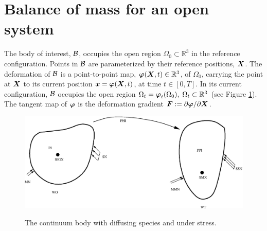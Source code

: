 \section{Balance of mass for an open system}
\label{sect2} The body of interest, ${\mathcal B}$, occupies the open
region $\Omega_0\subset\mathbb{R}^3$ in the reference
configuration. Points in ${\mathcal B}$ are parameterized by their
reference positions, $\mbox{\boldmath$ X$}$. The deformation of ${\mathcal B}$ is a
point-to-point map, $\mbox{\boldmath$\varphi$} (\mbox{\boldmath$ X$},t)\in\mathbb{R}^3$, of
$\Omega_0$, carrying the point at $\mbox{\boldmath$ X$}$ to its current position
$\mbox{\boldmath$ x$} = \mbox{\boldmath$\varphi$}(\mbox{\boldmath$ X$},t)$, at time $t\in [0,T]$. In its current
configuration, ${\mathcal B}$ occupies the open region $\Omega_t =
\mbox{\boldmath$\varphi$}_t(\Omega_0),\; \Omega_t\subset\mathbb{R}^3$ (see Figure
\ref{potato}). The tangent map of $\mbox{\boldmath$\varphi$}$ is the deformation
gradient $\mbox{\boldmath$ F$} :=
\partial\mbox{\boldmath$\varphi$}/\partial\mbox{\boldmath$ X$}$.
\begin{figure}[ht]
\centering{} 
 
 
{\includegraphics[width=14cm]{images/growth1.eps}} \caption{The continuum
body with diffusing species and under stress.}\label{potato}
\end{figure}

